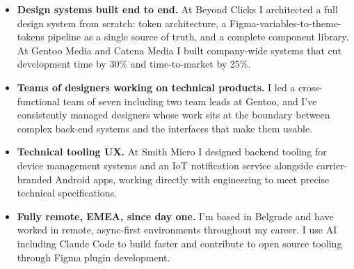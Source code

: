 \documentclass[]{cover-fira}
\begin{document}


\currentdate{\today}



{\raggedright{}\fontsize{11pt}{13pt}\selectfont
\begin{itemize}
  \item \textbf{Design systems built end to end.} At Beyond Clicks I architected
        a full design system from scratch: token architecture, a
        Figma-variables-to-theme-tokens pipeline as a single source of
        truth, and a complete component library. At Gentoo Media and
        Catena Media I built company-wide systems that cut development
        time by 30\% and time-to-market by 25\%.
  \item \textbf{Teams of designers working on technical products.} I led a
        cross-functional team of seven including two team leads at Gentoo,
        and I've consistently managed designers whose work sits at the
        boundary between complex back-end systems and the interfaces that
        make them usable.
  \item \textbf{Technical tooling UX.} At Smith Micro I designed backend
        tooling for device management systems and an IoT notification
        service alongside carrier-branded Android apps, working directly
        with engineering to meet precise technical specifications.
  \item \textbf{Fully remote, EMEA, since day one.} I'm based in Belgrade and
        have worked in remote, async-first environments throughout my
        career. I use AI including Claude Code to build faster and
        contribute to open source tooling through Figma plugin
        development.
\end{itemize}\par}
\end{document}
